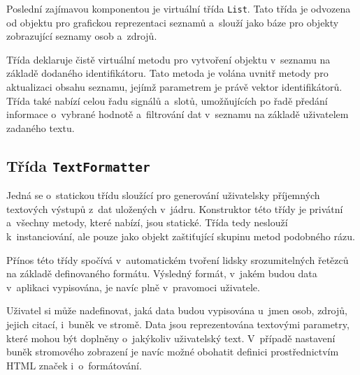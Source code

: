 		Poslední zajímavou komponentou je virtuální třída \texttt{List}. Tato třída je odvozena od objektu pro grafickou reprezentaci seznamů a~slouží jako báze pro objekty zobrazující seznamy osob a~zdrojů.\par
		Třída deklaruje čistě virtuální metodu pro vytvoření objektu v~seznamu na základě dodaného identifikátoru. Tato metoda je volána uvnitř metody pro aktualizaci obsahu seznamu, jejímž parametrem je právě vektor identifikátorů. Třída také nabízí celou řadu signálů a~slotů, umožňujících po řadě předání informace o~vybrané hodnotě a~filtrování dat v~seznamu na základě uživatelem zadaného textu.\par
		
		\subsection*{Třída \texttt{TextFormatter}}
		Jedná se o~statickou třídu sloužící pro generování uživatelsky příjemných textových výstupů z~dat uložených v~jádru. Konstruktor této třídy je privátní a~všechny metody, které nabízí, jsou statické. Třída tedy neslouží k~instanciování, ale pouze jako objekt zaštiťující skupinu metod podobného rázu.\par
		Přínos této třídy spočívá v~automatickém tvoření lidsky srozumitelných řetězců na základě definovaného formátu. Výsledný formát, v~jakém budou data v~aplikaci vypisována, je navíc plně v~pravomoci uživatele. \par
		Uživatel si může nadefinovat, jaká data budou vypisována u~jmen osob, zdrojů, jejich citací, i~buněk ve stromě. Data jsou reprezentována textovými parametry, které mohou být doplněny o~jakýkoliv uživatelský text. V~případě nastavení buněk stromového zobrazení je navíc možné obohatit definici prostřednictvím HTML značek i~o~formátování.\par


